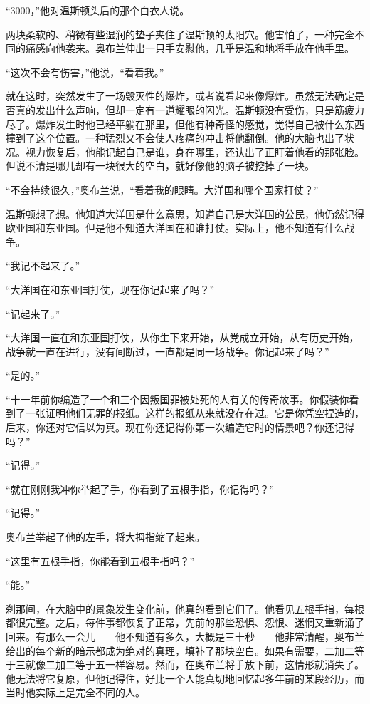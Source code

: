 ``3000，''他对温斯顿头后的那个白衣人说。

两块柔软的、稍微有些湿润的垫子夹住了温斯顿的太阳穴。他害怕了，一种完全不同的痛感向他袭来。奥布兰伸出一只手安慰他，几乎是温和地将手放在他手里。

``这次不会有伤害，''他说，``看着我。''

就在这时，突然发生了一场毁灭性的爆炸，或者说看起来像爆炸。虽然无法确定是否真的发出什么声响，但却一定有一道耀眼的闪光。温斯顿没有受伤，只是筋疲力尽了。爆炸发生时他已经平躺在那里，但他有种奇怪的感觉，觉得自己被什么东西撞到了这个位置。一种猛烈又不会使人疼痛的冲击将他翻倒。他的大脑也出了状况。视力恢复后，他能记起自己是谁，身在哪里，还认出了正盯着他看的那张脸。但说不清是哪儿却有一块很大的空白，就好像他的脑子被挖掉了一块。

``不会持续很久，''奥布兰说，``看着我的眼睛。大洋国和哪个国家打仗？''

温斯顿想了想。他知道大洋国是什么意思，知道自己是大洋国的公民，他仍然记得欧亚国和东亚国。但是他不知道大洋国在和谁打仗。实际上，他不知道有什么战争。

``我记不起来了。''

``大洋国在和东亚国打仗，现在你记起来了吗？''

``记起来了。''

``大洋国一直在和东亚国打仗，从你生下来开始，从党成立开始，从有历史开始，战争就一直在进行，没有间断过，一直都是同一场战争。你记起来了吗？''

``是的。''

``十一年前你编造了一个和三个因叛国罪被处死的人有关的传奇故事。你假装你看到了一张证明他们无罪的报纸。这样的报纸从来就没存在过。它是你凭空捏造的，后来，你还对它信以为真。现在你还记得你第一次编造它时的情景吧？你还记得吗？''

``记得。''

``就在刚刚我冲你举起了手，你看到了五根手指，你记得吗？''

``记得。''

奥布兰举起了他的左手，将大拇指缩了起来。

``这里有五根手指，你能看到五根手指吗？''

``能。''

刹那间，在大脑中的景象发生变化前，他真的看到它们了。他看见五根手指，每根都很完整。之后，每件事都恢复了正常，先前的那些恐惧、怨恨、迷惘又重新涌了回来。有那么一会儿------他不知道有多久，大概是三十秒------他非常清醒，奥布兰给出的每个新的暗示都成为绝对的真理，填补了那块空白。如果有需要，二加二等于三就像二加二等于五一样容易。然而，在奥布兰将手放下前，这情形就消失了。他无法将它复原，但他记得住，好比一个人能真切地回忆起多年前的某段经历，而当时他实际上是完全不同的人。

